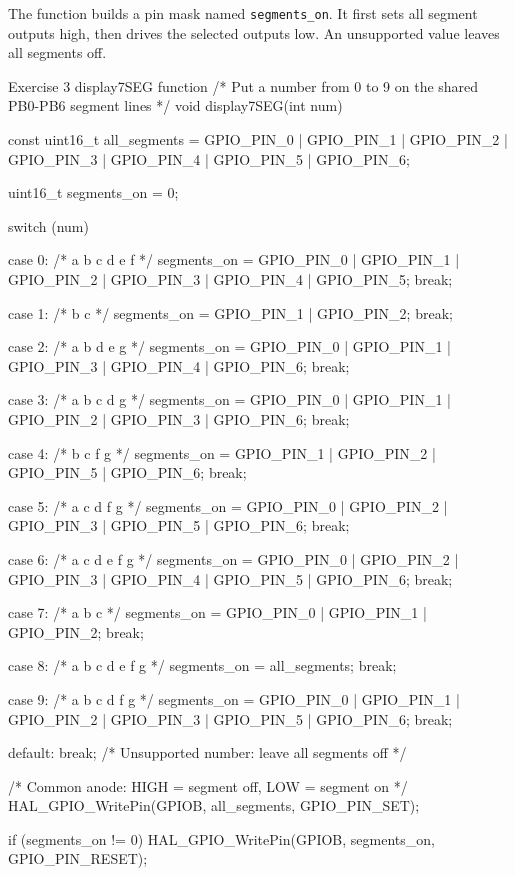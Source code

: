 \documentclass[a4paper]{article}
\begin{document}
The function builds a pin mask named
\texttt{segments\_on}. It first sets all segment
outputs high, then drives the selected outputs low.
An unsupported value leaves all segments off.

\begin{stmcode}{Exercise 3 display7SEG function}
/* Put a number from 0 to 9 on the shared PB0-PB6 segment lines */
void display7SEG(int num){
    const uint16_t all_segments =
        GPIO_PIN_0 | GPIO_PIN_1 | GPIO_PIN_2 | GPIO_PIN_3 |
        GPIO_PIN_4 | GPIO_PIN_5 | GPIO_PIN_6;

    uint16_t segments_on = 0;

    switch (num)
    {
        case 0: /* a b c d e f */
            segments_on = GPIO_PIN_0 | GPIO_PIN_1 | GPIO_PIN_2 |
                          GPIO_PIN_3 | GPIO_PIN_4 | GPIO_PIN_5;
            break;

        case 1: /* b c */
            segments_on = GPIO_PIN_1 | GPIO_PIN_2;
            break;

        case 2: /* a b d e g */
            segments_on = GPIO_PIN_0 | GPIO_PIN_1 | GPIO_PIN_3 |
                          GPIO_PIN_4 | GPIO_PIN_6;
            break;

        case 3: /* a b c d g */
            segments_on = GPIO_PIN_0 | GPIO_PIN_1 | GPIO_PIN_2 |
                          GPIO_PIN_3 | GPIO_PIN_6;
            break;

        case 4: /* b c f g */
            segments_on = GPIO_PIN_1 | GPIO_PIN_2 |
                          GPIO_PIN_5 | GPIO_PIN_6;
            break;

        case 5: /* a c d f g */
            segments_on = GPIO_PIN_0 | GPIO_PIN_2 | GPIO_PIN_3 |
                          GPIO_PIN_5 | GPIO_PIN_6;
            break;

        case 6: /* a c d e f g */
            segments_on = GPIO_PIN_0 | GPIO_PIN_2 | GPIO_PIN_3 |
                          GPIO_PIN_4 | GPIO_PIN_5 | GPIO_PIN_6;
            break;

        case 7: /* a b c */
            segments_on = GPIO_PIN_0 | GPIO_PIN_1 | GPIO_PIN_2;
            break;

        case 8: /* a b c d e f g */
            segments_on = all_segments;
            break;

        case 9: /* a b c d f g */
            segments_on = GPIO_PIN_0 | GPIO_PIN_1 | GPIO_PIN_2 |
                          GPIO_PIN_3 | GPIO_PIN_5 | GPIO_PIN_6;
            break;

        default:
            break; /* Unsupported number: leave all segments off */
    }

    /* Common anode: HIGH = segment off, LOW = segment on */
    HAL_GPIO_WritePin(GPIOB, all_segments, GPIO_PIN_SET);

    if (segments_on != 0)
    {
        HAL_GPIO_WritePin(GPIOB, segments_on, GPIO_PIN_RESET);
    }
  }
\end{stmcode}
\end{document}
